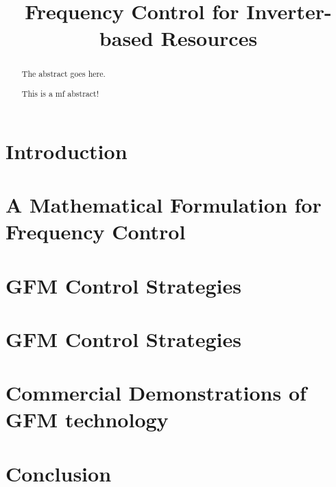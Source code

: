 \documentclass[journal]{IEEEtran}
\begin{document}
\title{Frequency Control for Inverter-based Resources}
\maketitle

\begin{abstract}
The abstract goes here.

This is a mf abstract!
\end{abstract}

\section{Introduction}

\section{A Mathematical Formulation for Frequency Control}

\section{GFM Control Strategies}

\section{GFM Control Strategies}

\section{Commercial Demonstrations of GFM technology}

\section{Conclusion}




\end{document}
